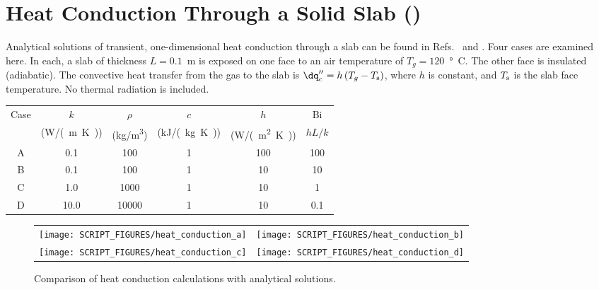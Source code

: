 \documentclass[11pt]{book}
\begin{document}
\clearpage

\section{Heat Conduction Through a Solid Slab (\texorpdfstring{}{heat\_conduction})}
\label{heat_conduction_a}
\label{heat_conduction_b}
\label{heat_conduction_c}
\label{heat_conduction_d}

Analytical solutions of transient, one-dimensional heat conduction through a slab can be found in Refs.~\cite{Drysdale:1} and \cite{Carslaw:1}. Four
cases are examined here. In each, a slab of thickness $L=0.1$~m is exposed on one face to an air temperature of $T_g=120$~\si{\degree C}. The other face
is insulated (adiabatic). The convective heat transfer from the gas to the slab is $\dq_c'' = h \, (T_g - T_{\rm s})$, where $h$ is constant, and $T_{\rm s}$ is
the slab face temperature. No thermal radiation is included.
\begin{center}
\begin{tabular}{|c|c|c|c|c|c|}
\hline
Case  &  $k$      & $\rho$       &  $c$          &   $h$         &  Bi     \\
      & (\si{W/(m.K)})  & (\si{kg/m^3})   &  (\si{kJ/(kg.K)})    &  (\si{W/(m^2.K)})  &  $hL/k$ \\ \hline \hline
A     &   0.1     & 100          &  1            &  100          &  100    \\ \hline
B     &   0.1     & 100          &  1            &  10           &  10     \\ \hline
C     &   1.0     & 1000         &  1            &  10           &  1      \\ \hline
D     &  10.0     & 10000        &  1            &  10           & 0.1     \\ \hline
\end{tabular}
\end{center}

\begin{figure}[ht]
\noindent
\begin{tabular*}{\textwidth}{l@{\extracolsep{\fill}}r}
\texttt{[image: SCRIPT\_FIGURES/heat\_conduction\_a]} &
\texttt{[image: SCRIPT\_FIGURES/heat\_conduction\_b]} \\
\texttt{[image: SCRIPT\_FIGURES/heat\_conduction\_c]} &
\texttt{[image: SCRIPT\_FIGURES/heat\_conduction\_d]}
\end{tabular*}
\caption[The  test cases]{Comparison of heat conduction calculations with analytical solutions.}
\label{heat_conduction}
\end{figure}
\end{document}
